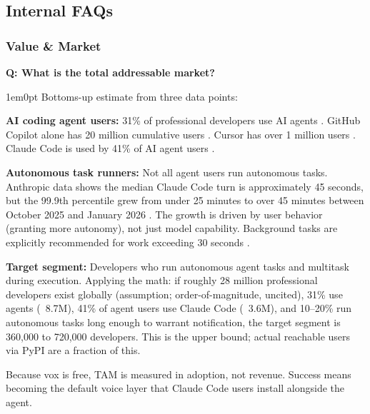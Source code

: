 \documentclass[11pt,letterpaper]{article}
\newcounter{faqnum}
\newenvironment{faqpair}[1]{%
  \needspace{4\baselineskip}%
  \vspace{0.5em}%
  \refstepcounter{faqnum}%
  \noindent\textbf{\color{SectionBlue}Q\thefaqnum: #1}\par\nopagebreak[4]%
  \vspace{0.2em}%
  \begin{adjustwidth}{1em}{0pt}%
  \setlength{\parindent}{0pt}%
}{%
  \end{adjustwidth}%
  \vspace{0.5em}%
}
\begin{document}

\newpage
\subsection*{Internal FAQs}

\subsubsection*{Value \& Market}

\begin{faqpair}{What is the total addressable market?}\label{faq:tam}
  Bottoms-up estimate from three data points:

  \textbf{AI coding agent users:} 31\% of professional developers use AI
  agents \cite{stackoverflow2025survey}. GitHub Copilot alone has 20 million
  cumulative users \cite{techcrunch2025copilot20m}. Cursor has over 1 million
  users \cite{opsera2025cursor}. Claude Code is used by 41\% of AI agent users
  \cite{stackoverflow2025survey}.

  \textbf{Autonomous task runners:} Not all agent users run autonomous tasks.
  Anthropic data shows the median Claude Code turn is approximately 45 seconds,
  but the 99.9th percentile grew from under 25 minutes to over 45 minutes
  between October 2025 and January 2026 \cite{anthropic2026agentautonomy}. The
  growth is driven by user behavior (granting more autonomy), not just
  model capability. Background tasks are explicitly recommended for work
  exceeding 30 seconds \cite{venturebeat2025claudetasks}.

  \textbf{Target segment:} Developers who run autonomous agent tasks and
  multitask during execution. Applying the math: if roughly 28 million
  professional developers exist globally (assumption; order-of-magnitude,
  uncited), 31\% use agents (~8.7M), 41\%
  of agent users use Claude Code (~3.6M), and 10--20\% run autonomous tasks
  long enough to warrant notification, the target segment is 360{,}000 to
  720{,}000 developers. This is the upper bound; actual reachable users via
  PyPI are a fraction of this.

  Because vox is free, TAM is measured in adoption, not revenue. Success
  means becoming the default voice layer that Claude Code users install
  alongside the agent.
\end{faqpair}
\end{document}
